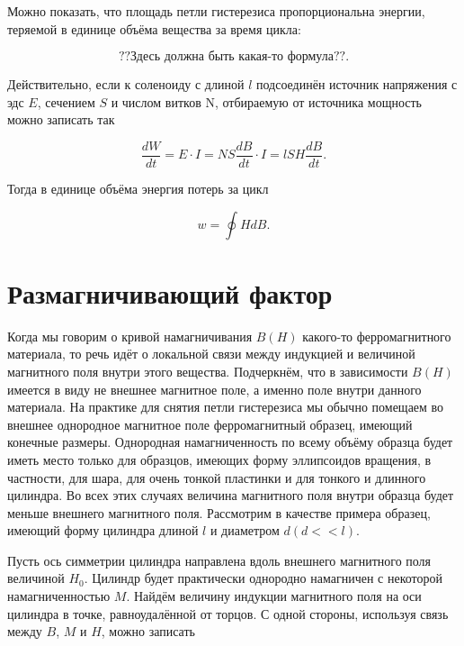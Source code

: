 Можно показать, что площадь петли гистерезиса пропорциональна энергии, теряемой в единице объёма вещества за время цикла:

\begin{equation*}
	\text{??Здесь должна быть какая-то формула??}.
\end{equation*}

Действительно, если к соленоиду с длиной $l$ подсоединён источник напряжения с эдс $E$, сечением $S$ и числом витков N, отбираемую от источника мощность можно записать так

 
\begin{equation*}
	\frac{dW}{dt} = E \cdot I = NS \frac{dB}{dt} \cdot I = lSH \frac{dB}{dt}.
\end{equation*}

Тогда в единице объёма энергия потерь за цикл

\begin{equation*}
	w = \oint {HdB}.
\end{equation*}

\section{Размагничивающий фактор}

Когда мы говорим о кривой намагничивания $B(H)$ какого-то ферромагнитного материала, то речь идёт о локальной связи между индукцией и величиной магнитного поля внутри этого вещества. Подчеркнём, что в зависимости $B(H)$ имеется в виду не внешнее магнитное поле, а именно поле внутри данного материала. На практике для снятия петли гистерезиса мы обычно помещаем во внешнее однородное магнитное поле ферромагнитный образец, имеющий конечные размеры. Однородная намагниченность по всему объёму образца будет иметь место только для образцов, имеющих форму эллипсоидов вращения, в частности, для шара, для очень тонкой пластинки и для тонкого и длинного цилиндра. Во всех этих случаях величина магнитного поля внутри образца будет меньше внешнего магнитного поля. Рассмотрим в качестве примера образец, имеющий форму цилиндра длиной $l$ и диаметром $d (d<<l)$.

Пусть ось симметрии цилиндра направлена вдоль внешнего магнитного поля величиной $H_0$. Цилиндр будет практически однородно намагничен с некоторой намагниченностью $M$. Найдём величину индукции магнитного поля на оси цилиндра в точке, равноудалённой от торцов. С одной стороны, используя связь между $B$, $M$ и $H$, можно записать


